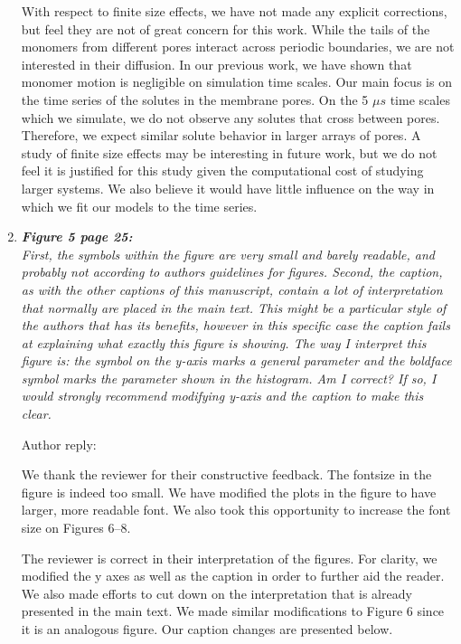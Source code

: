 \documentclass{article}
\begin{document}
\begin{enumerate}[label={Comment \theenumi :}, leftmargin=3.9\parindent]
  With respect to finite size effects, we have not made any explicit corrections, but
  feel they are not of great concern for this work. While the tails of the monomers from
  different pores interact across periodic boundaries, we are not interested in their
  diffusion. In our previous work, we have shown that monomer motion is negligible on 
  simulation time scales. Our main focus is on the time series of the solutes in the
  membrane pores. On the 5 $\mu s$ time scales which we simulate, we do not observe any 
  solutes that cross between pores. Therefore, we expect similar solute behavior in larger
  arrays of pores. A study of finite size effects may be interesting in future work, but
  we do not feel it is justified for this study given the computational cost of studying
  larger systems. We also believe it would have little influence on the way in which 
  we fit our models to the time series.
        
  \item \textit{\textbf{Figure 5 page 25:} \\
		First, the symbols within the figure are very small and barely readable, and probably not
		according to authors guidelines for figures. Second, the caption, as with the other captions of
		this manuscript, contain a lot of interpretation that normally are placed in the main text. This
		might be a particular style of the authors that has its benefits, however in this specific case the
		caption fails at explaining what exactly this figure is showing. The way I interpret this figure is:
		the symbol on the y-axis marks a general parameter and the boldface symbol marks the
		parameter shown in the histogram. Am I correct? If so, I would strongly recommend modifying
		y-axis and the caption to make this clear.}
		
		Author reply:
		
		We thank the reviewer for their constructive feedback. The fontsize in the figure is indeed too small.
		We have modified the plots in the figure to have larger, more readable font. We also took this 
		opportunity to increase the font size on Figures 6--8.
		
		The reviewer is correct in their interpretation of the figures. For clarity, we modified the y axes as
		well as the caption in order to further aid the reader. We also made efforts to cut down on the interpretation
		that is already presented in the main text. We made similar modifications to Figure 6 since it is an
		analogous figure. Our caption changes are presented below.
		

\end{enumerate}
\end{document}

